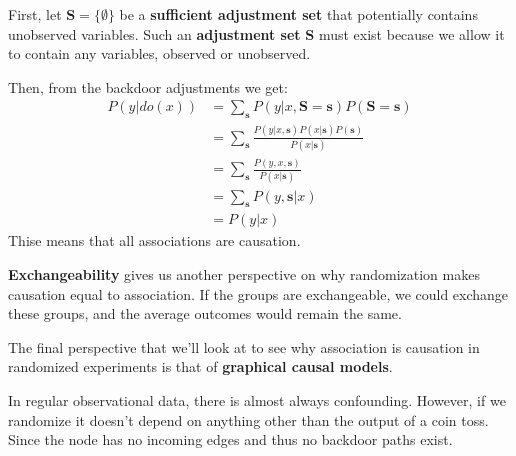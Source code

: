 First, let $\mathbf{S} = \{\emptyset\}$ be a \textbf{sufficient adjustment set}
that potentially contains unobserved variables. Such an \textbf{adjustment set}
$\mathbf{S}$ must exist because we allow it to contain any variables, observed
or unobserved.

Then, from the backdoor adjustments we get:
\begin{equation}
    \begin{array}{ll}
        P(y|do(x)) & = \sum_{\mathbf{s}} P(y|x, \mathbf{S} = \mathbf{s})P(\mathbf{S} = \mathbf{s})                \\
                   & = \sum_{\mathbf{s}} \frac{P(y|x, \mathbf{s})P(x|\mathbf{s})P(\mathbf{s})}{P(x | \mathbf{s})} \\
                   & = \sum_{\mathbf{s}} \frac{P(y, x, \mathbf{s})}{P(x | \mathbf{s})}                            \\
                   & = \sum_{\mathbf{s}} P(y, \mathbf{s}| x)                                                      \\
                   & = P(y | x)
    \end{array}
\end{equation}
Thise means that all associations are causation.

\textbf{Exchangeability} gives us another perspective on why randomization makes
causation equal to association. If the groups are exchangeable, we could exchange
these groups, and the average outcomes would remain the same.

The final perspective that we'll look at to see why association is causation in
randomized experiments is that of \textbf{graphical causal models}.

In regular observational data, there is almost always confounding. However, if we
randomize it doesn't depend on anything other than the output of a coin toss.
Since the node has no incoming edges and thus no backdoor paths exist.